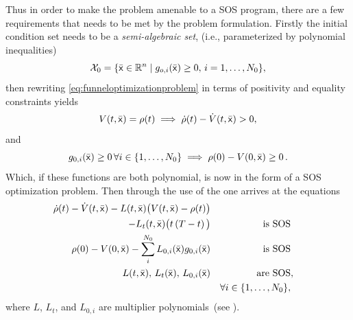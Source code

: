 Thus in order to make the problem amenable to a \ac{SOS} program, there are a
few requirements that needs to be met by the problem formulation. Firstly the
initial condition set needs to be a \textit{semi-algebraic set}, (i.e.,
parameterized by polynomial inequalities)
%
\begin{equation}
  \mathcal{X}_0 = \lbrace\bar{{\mathbf{\mathsf{x}}}} \in \mathbb{R}^n \mid g_{o,i}(\bar{{\mathbf{\mathsf{x}}}}) \geq 0, \, i = 1,\ldots,N_0\rbrace,
\end{equation}
%
then rewriting \cref{eq:funneloptimizationproblem} in terms of positivity and
equality constraints yields
\begin{equation}
  V(t,\bar{{\mathbf{\mathsf{x}}}}) = \rho(t) \implies \dot{\rho}(t) - \dot{V}(t,\bar{{\mathbf{\mathsf{x}}}}) > 0,
\end{equation}
and
\begin{equation}
  g_{0,i}(\bar{{\mathbf{\mathsf{x}}}}) \geq 0 \, \forall i \in \lbrace1,\ldots,N_0\rbrace \implies \rho(0) - V(0,\bar{{\mathbf{\mathsf{x}}}}) \geq 0 \, .
\end{equation}
Which, if these functions are both polynomial, is now in the form of a \ac{SOS}
optimization problem. Then through the use of the  one
arrives at the equations
\begin{subequations}
\begin{align}
  \dot{\rho}(t) - \dot{V}(t,\bar{{\mathbf{\mathsf{x}}}}) - L(t,\bar{{\mathbf{\mathsf{x}}}}) \big( V(t,\bar{{\mathbf{\mathsf{x}}}}) - \rho(t) \big)& \nonumber \\
                                            - L_{t}(t,\bar{{\mathbf{\mathsf{x}}}})\big( t\left( T - t \right) \big)&   \label{eq:sufficient-conditions}
  &\text{is SOS}&  \\
  \rho(0) - V(0,\bar{{\mathbf{\mathsf{x}}}}) - \sum_{i}^{N_{0}} L_{0,i}(\bar{{\mathbf{\mathsf{x}}}})g_{0,i}(\bar{{\mathbf{\mathsf{x}}}})&  &\text{is SOS}&  \\
  L(t, \bar{{\mathbf{\mathsf{x}}}}), \, L_{t}(\bar{{\mathbf{\mathsf{x}}}}), \, L_{0,i}(\bar{{\mathbf{\mathsf{x}}}})& &\text{are SOS}&, \nonumber \\
  &&\forall i \in \lbrace1,\ldots,N_{0}\rbrace,& \nonumber
\end{align} 
\end{subequations}
where \(L\), \(L_{t}\), and \(L_{0,i}\) are multiplier polynomials~(see
).

